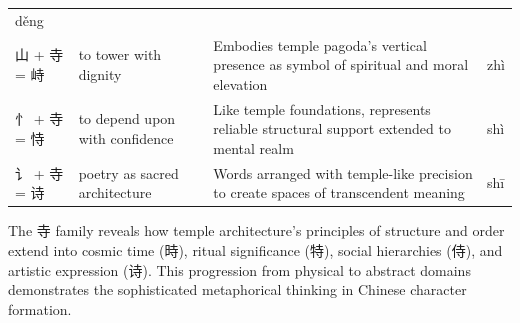 \begin{longtable}[]{@{}llll@{}}
\begin{minipage}[t]{0.14\columnwidth}
děng\strut
\end{minipage}\tabularnewline
\begin{minipage}[t]{0.14\columnwidth}\raggedright
山 + 寺 = 峙\strut
\end{minipage} & \begin{minipage}[t]{0.14\columnwidth}\raggedright
to tower with dignity\strut
\end{minipage} & \begin{minipage}[t]{0.45\columnwidth}\raggedright
Embodies temple pagoda's vertical presence as symbol of spiritual and
moral elevation\strut
\end{minipage} & \begin{minipage}[t]{0.14\columnwidth}\raggedright
zhì\strut
\end{minipage}\tabularnewline
\begin{minipage}[t]{0.14\columnwidth}\raggedright
忄 + 寺 = 恃\strut
\end{minipage} & \begin{minipage}[t]{0.14\columnwidth}\raggedright
to depend upon with confidence\strut
\end{minipage} & \begin{minipage}[t]{0.45\columnwidth}\raggedright
Like temple foundations, represents reliable structural support extended
to mental realm\strut
\end{minipage} & \begin{minipage}[t]{0.14\columnwidth}\raggedright
shì\strut
\end{minipage}\tabularnewline
\begin{minipage}[t]{0.14\columnwidth}\raggedright
讠 + 寺 = 诗\strut
\end{minipage} & \begin{minipage}[t]{0.14\columnwidth}\raggedright
poetry as sacred architecture\strut
\end{minipage} & \begin{minipage}[t]{0.45\columnwidth}\raggedright
Words arranged with temple-like precision to create spaces of
transcendent meaning\strut
\end{minipage} & \begin{minipage}[t]{0.14\columnwidth}\raggedright
shī\strut
\end{minipage}\tabularnewline
\bottomrule
\end{longtable}

The 寺 family reveals how temple architecture's principles of structure
and order extend into cosmic time (時), ritual significance (特), social
hierarchies (侍), and artistic expression (诗). This progression from
physical to abstract domains demonstrates the sophisticated metaphorical
thinking in Chinese character formation.

